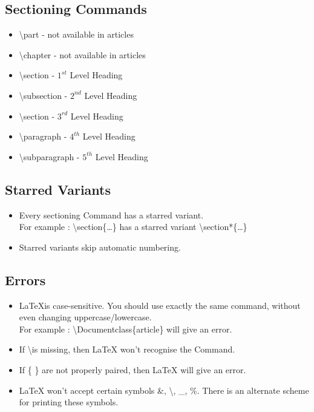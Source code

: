 \documentclass{article}
\begin{document}
\subsection{Sectioning Commands}
\begin{itemize}
	\item \textbackslash{}part - not available in articles
	\item \textbackslash{}chapter - not available in articles
	\item \textbackslash{}section - $1^{st}$ Level Heading
	\item \textbackslash{}subsection - $2^{nd}$ Level Heading
	\item \textbackslash{}section - $3^{rd}$ Level Heading
	\item \textbackslash{}paragraph - $4^{th}$ Level Heading
	\item \textbackslash{}subparagraph -  $5^{th}$ Level Heading
\end{itemize}

\subsection{Starred Variants}
\begin{itemize}
	\item Every sectioning Command has a starred variant. \\ For example : \textbackslash{}section\{\dots\} has a starred variant \textbackslash{}section*\{\dots\}
	\item Starred variants skip automatic numbering.
\end{itemize}

\subsection{Errors}
\begin{itemize}
	\item \LaTeX is case-sensitive. You should use exactly the same command, without even changing uppercase/lowercase.\\ For example : \textbackslash{}Documentclass\{article\} will give an error.
	\item If \textbackslash is missing, then \LaTeX{} won't recognise the Command.
	\item If \{ \} are not properly paired, then \LaTeX{} will give an error.
	\item \LaTeX{} won't accept certain symbols \&, \textbackslash, \_, \%. There is an alternate scheme for printing these symbols.
\end{itemize}
\end{document}
